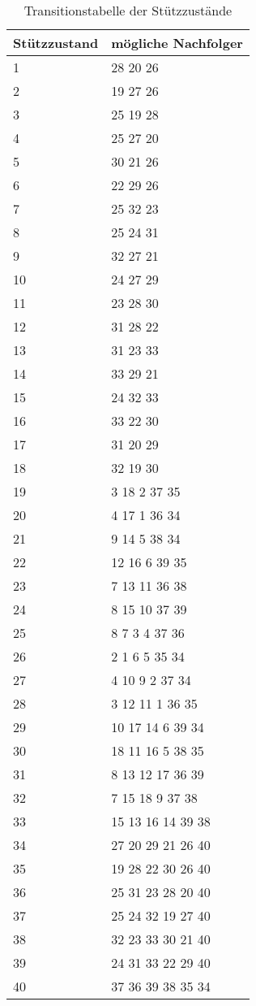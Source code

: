 \begin{table}[t!]
  \caption{\label{trans_support} Transitionstabelle der Stützzustände \autocite{herms2004}}
  \centering
  \sffamily
  \begin{footnotesize}
    \begin{tabular}{l l}
    \toprule
    \textbf{Stützzustand} & \textbf{mögliche Nachfolger}\\
    \midrule
    1 & 28 20 26\\
    2 & 19 27 26\\
    3 & 25 19 28\\
    4 & 25 27 20\\
    5 & 30 21 26\\
    6 & 22 29 26\\
    7 & 25 32 23\\
    8 & 25 24 31\\
    9 & 32 27 21\\
    10 & 24 27 29\\
    11 & 23 28 30\\
    12 & 31 28 22\\
    13 & 31 23 33\\
    14 & 33 29 21\\
    15 & 24 32 33\\
    16 & 33 22 30\\
    17 & 31 20 29\\
    18 & 32 19 30\\
    19 & 3 18 2 37 35\\
    20 & 4 17 1 36 34\\
    21&9 14 5 38 34 \\
    22&12 16 6 39 35 \\
    23&7 13 11 36 38 \\
    24&8 15 10 37 39 \\
    25&8 7 3 4 37 36 \\
    26&2 1 6 5 35 34 \\
    27&4 10 9 2 37 34 \\
    28&3 12 11 1 36 35 \\  
    29&10 17 14 6 39 34 \\
    30&18 11 16 5 38 35 \\
    31&8 13 12 17 36 39 \\ 
    32&7 15 18 9 37 38 \\
    33&15 13 16 14 39 38 \\
    34&27 20 29 21 26 40 \\
    35&19 28 22 30 26 40 \\  
    36&25 31 23 28 20 40 \\
    37&25 24 32 19 27 40 \\
    38&32 23 33 30 21 40 \\
    39&24 31 33 22 29 40 \\
    40&37 36 39 38 35 34 \\
    \bottomrule
    \end{tabular}
  \end{footnotesize}
  \rmfamily
\end{table}

